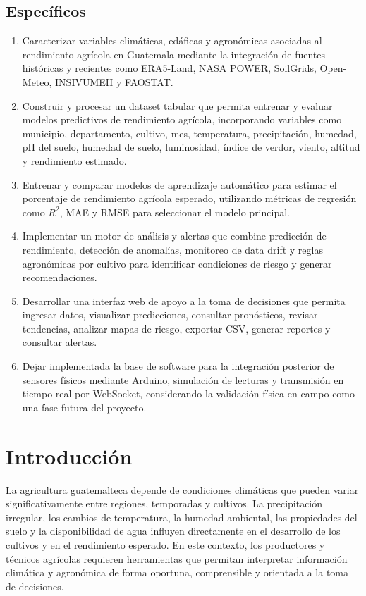 \documentclass[12pt,letterpaper,oneside]{report}
\begin{document}
\section*{Específicos}
\begin{enumerate}
\item Caracterizar variables climáticas, edáficas y agronómicas asociadas al rendimiento agrícola en Guatemala mediante la integración de fuentes históricas y recientes como ERA5-Land, NASA POWER, SoilGrids, Open-Meteo, INSIVUMEH y FAOSTAT.
\item Construir y procesar un dataset tabular que permita entrenar y evaluar modelos predictivos de rendimiento agrícola, incorporando variables como municipio, departamento, cultivo, mes, temperatura, precipitación, humedad, pH del suelo, humedad de suelo, luminosidad, índice de verdor, viento, altitud y rendimiento estimado.
\item Entrenar y comparar modelos de aprendizaje automático para estimar el porcentaje de rendimiento agrícola esperado, utilizando métricas de regresión como $R^2$, MAE y RMSE para seleccionar el modelo principal.
\item Implementar un motor de análisis y alertas que combine predicción de rendimiento, detección de anomalías, monitoreo de data drift y reglas agronómicas por cultivo para identificar condiciones de riesgo y generar recomendaciones.
\item Desarrollar una interfaz web de apoyo a la toma de decisiones que permita ingresar datos, visualizar predicciones, consultar pronósticos, revisar tendencias, analizar mapas de riesgo, exportar CSV, generar reportes y consultar alertas.
\item Dejar implementada la base de software para la integración posterior de sensores físicos mediante Arduino, simulación de lecturas y transmisión en tiempo real por WebSocket, considerando la validación física en campo como una fase futura del proyecto.
\end{enumerate}

\chapter*{Introducción}

La agricultura guatemalteca depende de condiciones climáticas que pueden variar significativamente entre regiones, temporadas y cultivos. La precipitación irregular, los cambios de temperatura, la humedad ambiental, las propiedades del suelo y la disponibilidad de agua influyen directamente en el desarrollo de los cultivos y en el rendimiento esperado. En este contexto, los productores y técnicos agrícolas requieren herramientas que permitan interpretar información climática y agronómica de forma oportuna, comprensible y orientada a la toma de decisiones.
\end{document}

